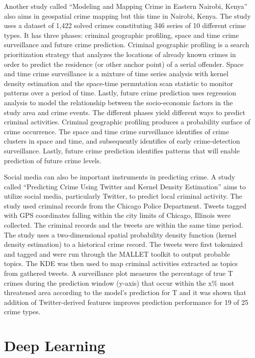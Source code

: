     Another study called “Modeling and Mapping Crime in Eastern Nairobi, Kenya” \cite{mburu2014modeling} also aims in geospatial crime mapping but this time in Nairobi, Kenya. The study uses a dataset of 1,422 solved crimes constituting 346 series of 10 different crime types. It has three phases: criminal geographic profiling, space and time crime surveillance and future crime prediction. Criminal geographic profiling is a search prioritization strategy that analyzes the locations of already known crimes in order to predict the residence (or other anchor point) of a serial offender. Space and time crime surveillance is a mixture of time series analysis with kernel density estimation and the space-time permutation scan statistic to monitor patterns over a period of time. Lastly, future crime prediction uses regression analysis to model the relationship between the socio-economic factors in the study area and crime events. The different phases yield different ways to predict criminal activities. Criminal geographic profiling produces a probability surface of crime occurrence. The space and time crime surveillance identifies of crime clusters in space and time, and subsequently identifies of early crime-detection surveillance. Lastly, future crime prediction identifies patterns that will enable prediction of future crime levels.

    Social media can also be important instruments in predicting crime. A study called “Predicting Crime Using Twitter and Kernel Density Estimation” \cite{gerber2014predicting} aims to utilize social media, particularly Twitter, to predict local criminal activity. The study used criminal records from the Chicago Police Department. Tweets tagged with GPS coordinates falling within the city limits of Chicago, Illinois were collected. The criminal records and the tweets are within the same time period. The study uses a two-dimensional spatial probability density function (kernel density estimation) to a historical crime record. The tweets were first tokenized and tagged and were run through the MALLET toolkit to output probable topics. The KDE was then used to map criminal activities extracted as topics from gathered tweets. A surveillance plot measures the percentage of true T crimes during the prediction window (y-axis) that occur within the x\% most threatened area according to the model's prediction for T and it was shown that addition of Twitter-derived features improves prediction performance for 19 of 25 crime types.

\section{Deep Learning}


